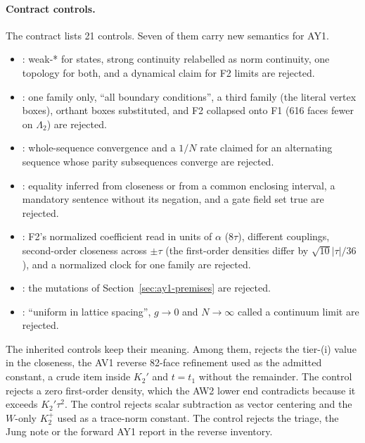 \paragraph{Contract controls.}
The contract lists 21 controls. Seven of them carry new semantics for AY1.
\begin{itemize}\raggedright
\item {}: weak-* for states, strong continuity relabelled
 as norm continuity, one topology for both, and a dynamical claim for F2
 limits are rejected.
\item {}: one family only, ``all boundary
 conditions'', a third family (the literal vertex boxes), orthant boxes
 substituted, and F2 collapsed onto F1 (616 faces fewer on $\Lambda_2$) are
 rejected.
\item {}: whole-sequence convergence
 and a $1/N$ rate claimed for an alternating sequence whose parity
 subsequences converge are rejected.
\item {}: equality inferred from
 closeness or from a common enclosing interval, a mandatory sentence without
 its negation, and a gate field set true are rejected.
\item {}: F2's normalized coefficient read in units of
 $\alpha$ ($8\tau$), different couplings, second-order closeness across
 $\pm\tau$ (the first-order densities differ by $\sqrt{10}|\tau|/36$), and a
 normalized clock for one family are rejected.
\item {}: the mutations of
 Section~\ref{sec:ay1-premises} are rejected.
\item {}: ``uniform in lattice spacing'', $g\to0$ and
 $N\to\infty$ called a continuum limit are rejected.
\end{itemize}
The inherited controls keep their meaning. Among them,
 rejects the tier-(i) value in the closeness, the
AV1 reverse 82-face refinement used as the admitted constant, a crude item
inside $K_2'$ and $t=t_1$ without the remainder. The control
 rejects a zero first-order density, which
the AW2 lower end contradicts because it exceeds $K_2'\tau^2$. The control
 rejects scalar subtraction as vector
centering and the $W$-only $K_2^+$ used as a trace-norm constant. The control
 rejects the triage, the Jung note or the
forward AY1 report in the reverse inventory.

